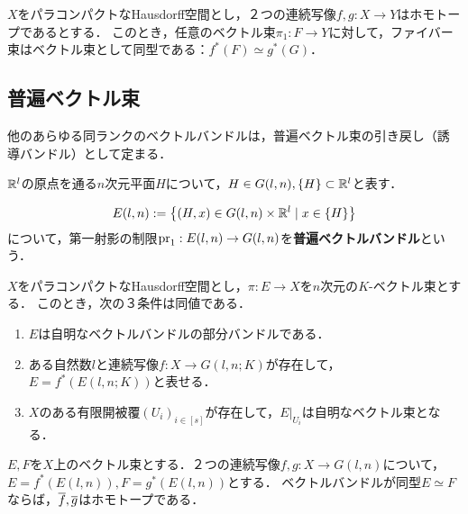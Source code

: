\documentclass[uplatex,dvipdfmx]{jsreport}
\begin{document}
\begin{theorem}
    $X$をパラコンパクトなHausdorff空間とし，２つの連続写像$f,g:X\to Y$はホモトープであるとする．
    このとき，任意のベクトル束$\pi_1:F\to Y$に対して，ファイバー束はベクトル束として同型である：$f^*(F)\simeq g^*(G)$．
\end{theorem}

\subsection{普遍ベクトル束}

\begin{tcolorbox}[colframe=ForestGreen, colback=ForestGreen!10!white,breakable,colbacktitle=ForestGreen!40!white,coltitle=black,fonttitle=\bfseries\sffamily,
title=]
    他のあらゆる同ランクのベクトルバンドルは，普遍ベクトル束の引き戻し（誘導バンドル）として定まる．
\end{tcolorbox}

\begin{notation}
    $\mathbb{R}^l$の原点を通る$n$次元平面$H$について，$H\in G(l,n),\{H\}\subset\mathbb{R}^l$と表す．
\end{notation}

\begin{definition}
    \[E(l,n):=\left\{(H,x)\in G(l,n)\times\mathbb{R}^l\mid x\in\{H\}\right\}\]
    について，第一射影の制限$\mathrm{pr}_1:E(l,n)\to G(l,n)$を\textbf{普遍ベクトルバンドル}という．
\end{definition}

\begin{theorem}
    $X$をパラコンパクトなHausdorff空間とし，$\pi:E\to X$を$n$次元の$K$-ベクトル束とする．
    このとき，次の３条件は同値である．
    \begin{enumerate}
        \item $E$は自明なベクトルバンドルの部分バンドルである．
        \item ある自然数$l$と連続写像$f:X\to G(l,n;K)$が存在して，$E=f^*(E(l,n;K))$と表せる．
        \item $X$のある有限開被覆$(U_i)_{i\in[s]}$が存在して，$E|_{U_i}$は自明なベクトル束となる．
    \end{enumerate}
\end{theorem}

\begin{theorem}
    $E,F$を$X$上のベクトル束とする．２つの連続写像$f,g:X\to G(l,n)$について，$E=f^*(E(l,n)),F=g^*(E(l,n))$とする．
    ベクトルバンドルが同型$E\simeq F$ならば，$\overline{f},\overline{g}$はホモトープである．
\end{theorem}
\end{document}
